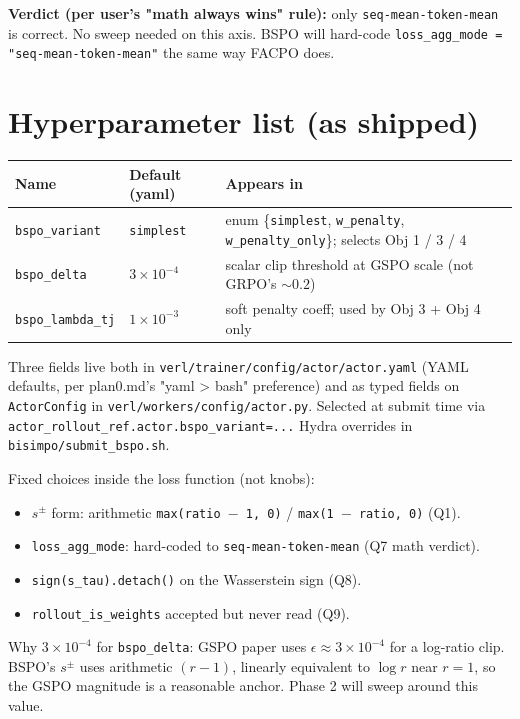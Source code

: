 \documentclass{article}
\begin{document}
\textbf{Verdict (per user's "math always wins" rule):} only
\texttt{seq-mean-token-mean} is correct. No sweep needed on this axis. BSPO
will hard-code \texttt{loss\_agg\_mode = "seq-mean-token-mean"} the same way
FACPO does.

\section{Hyperparameter list (as shipped)}

\begin{tabular}{l|l|l}
\textbf{Name} & \textbf{Default (yaml)} & \textbf{Appears in} \\
\hline
\texttt{bspo\_variant}    & \texttt{simplest} & enum \{\texttt{simplest}, \texttt{w\_penalty}, \texttt{w\_penalty\_only}\}; selects Obj 1 / 3 / 4 \\
\texttt{bspo\_delta}      & $3 \times 10^{-4}$ & scalar clip threshold at GSPO scale (not GRPO's $\sim 0.2$) \\
\texttt{bspo\_lambda\_tj} & $1 \times 10^{-3}$ & soft penalty coeff; used by Obj 3 + Obj 4 only \\
\end{tabular}

Three fields live both in \texttt{verl/trainer/config/actor/actor.yaml}
(YAML defaults, per plan0.md's "yaml > bash" preference) and as typed
fields on \texttt{ActorConfig} in \texttt{verl/workers/config/actor.py}.
Selected at submit time via
\texttt{actor\_rollout\_ref.actor.bspo\_variant=...} Hydra overrides in
\texttt{bisimpo/submit\_bspo.sh}.

Fixed choices inside the loss function (not knobs):
\begin{itemize}
\item $s^\pm$ form: arithmetic \texttt{max(ratio $-$ 1, 0)} / \texttt{max(1 $-$ ratio, 0)} (Q1).
\item \texttt{loss\_agg\_mode}: hard-coded to \texttt{seq-mean-token-mean} (Q7 math verdict).
\item \texttt{sign(s\_tau).detach()} on the Wasserstein sign (Q8).
\item \texttt{rollout\_is\_weights} accepted but never read (Q9).
\end{itemize}

Why $3 \times 10^{-4}$ for \texttt{bspo\_delta}: GSPO paper uses
$\epsilon \approx 3 \times 10^{-4}$ for a log-ratio clip. BSPO's $s^\pm$
uses arithmetic $(r - 1)$, linearly equivalent to $\log r$ near $r = 1$,
so the GSPO magnitude is a reasonable anchor. Phase 2 will sweep around
this value.
\end{document}
